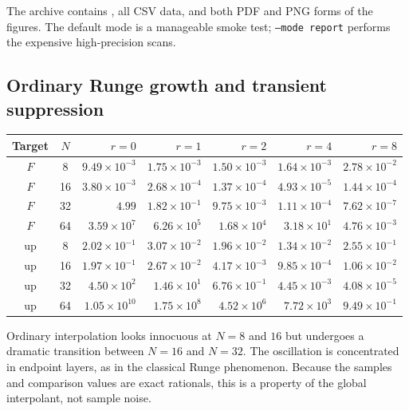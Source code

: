 \documentclass[11pt,oneside]{article}
\theoremstyle{definition}
\theoremstyle{remark}
\newcommand{\Up}{\operatorname{up}}
\begin{document}
The archive contains
, all CSV data, and both PDF and PNG forms
of the figures.  The default mode is a manageable smoke test; \texttt{--mode report}
performs the expensive high-precision scans.

\subsection{Ordinary Runge growth and transient suppression}

\begin{center}
\small
\setlength{\tabcolsep}{4.5pt}
\begin{tabular}{@{}ccrrrrr@{}}
\toprule
Target & $N$ & $r=0$ & $r=1$ & $r=2$ & $r=4$ & $r=8$\\
\midrule
$F$ & 8  & $9.49\!\times\!10^{-3}$ & $1.75\!\times\!10^{-3}$ & $1.50\!\times\!10^{-3}$ & $1.64\!\times\!10^{-3}$ & $2.78\!\times\!10^{-2}$\\
$F$ & 16 & $3.80\!\times\!10^{-3}$ & $2.68\!\times\!10^{-4}$ & $1.37\!\times\!10^{-4}$ & $4.93\!\times\!10^{-5}$ & $1.44\!\times\!10^{-4}$\\
$F$ & 32 & $4.99$ & $1.82\!\times\!10^{-1}$ & $9.75\!\times\!10^{-3}$ & $1.11\!\times\!10^{-4}$ & $7.62\!\times\!10^{-7}$\\
$F$ & 64 & $3.59\!\times\!10^{7}$ & $6.26\!\times\!10^{5}$ & $1.68\!\times\!10^{4}$ & $3.18\!\times\!10^{1}$ & $4.76\!\times\!10^{-3}$\\
\midrule
$\Up$ & 8  & $2.02\!\times\!10^{-1}$ & $3.07\!\times\!10^{-2}$ & $1.96\!\times\!10^{-2}$ & $1.34\!\times\!10^{-2}$ & $2.55\!\times\!10^{-1}$\\
$\Up$ & 16 & $1.97\!\times\!10^{-1}$ & $2.67\!\times\!10^{-2}$ & $4.17\!\times\!10^{-3}$ & $9.85\!\times\!10^{-4}$ & $1.06\!\times\!10^{-2}$\\
$\Up$ & 32 & $4.50\!\times\!10^{2}$ & $1.46\!\times\!10^{1}$ & $6.76\!\times\!10^{-1}$ & $4.45\!\times\!10^{-3}$ & $4.08\!\times\!10^{-5}$\\
$\Up$ & 64 & $1.05\!\times\!10^{10}$ & $1.75\!\times\!10^{8}$ & $4.52\!\times\!10^{6}$ & $7.72\!\times\!10^{3}$ & $9.49\!\times\!10^{-1}$\\
\bottomrule
\end{tabular}
\label{tab:fixed-errors}
\end{center}

Ordinary interpolation looks innocuous at $N=8$ and $16$ but undergoes a dramatic transition
between $N=16$ and $N=32$.  The oscillation is concentrated in endpoint layers, as in the
classical Runge phenomenon.  Because the samples and comparison values are exact rationals,
this is a property of the global interpolant, not sample noise.
\end{document}

